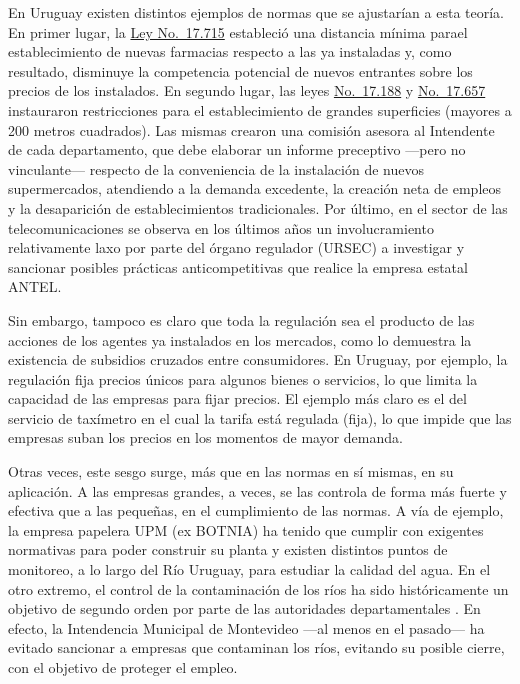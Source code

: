 \documentclass[
  12pt,
  spanish,
]{book}
\begin{document}
En Uruguay existen distintos ejemplos de normas que se ajustarían a esta
teoría. En primer lugar, la
\href{http://www.parlamento.gub.uy/leyes/AccesoTextoLey.asp?Ley=17715\&Anchor=}{Ley
No.~17.715} estableció una distancia mínima parael establecimiento de
nuevas farmacias respecto a las ya instaladas y, como resultado,
disminuye la competencia potencial de nuevos entrantes sobre los precios
de los instalados. En segundo lugar, las leyes
\href{http://www.parlamento.gub.uy/leyes/AccesoTextoLey.asp?Ley=17188\&Anchor=}{No.~17.188}
y
\href{http://www.parlamento.gub.uy/leyes/AccesoTextoLey.asp?Ley=17657\&Anchor=}{No.~17.657}
instauraron restricciones para el establecimiento de grandes superficies
(mayores a 200 metros cuadrados). Las mismas crearon una comisión
asesora al Intendente de cada departamento, que debe elaborar un informe
preceptivo ---pero no vinculante--- respecto de la conveniencia de la
instalación de nuevos supermercados, atendiendo a la demanda excedente,
la creación neta de empleos y la desaparición de establecimientos
tradicionales. Por último, en el sector de las telecomunicaciones se
observa en los últimos años un involucramiento relativamente laxo por
parte del órgano regulador (URSEC) a investigar y sancionar posibles
prácticas anticompetitivas que realice la empresa estatal ANTEL.

Sin embargo, tampoco es claro que toda la regulación sea el producto de
las acciones de los agentes ya instalados en los mercados, como lo
demuestra la existencia de subsidios cruzados entre consumidores. En
Uruguay, por ejemplo, la regulación fija precios únicos para algunos
bienes o servicios, lo que limita la capacidad de las empresas para
fijar precios. El ejemplo más claro es el del servicio de taxímetro en
el cual la tarifa está regulada (fija), lo que impide que las empresas
suban los precios en los momentos de mayor demanda.

Otras veces, este sesgo surge, más que en las normas en sí mismas, en su
aplicación. A las empresas grandes, a veces, se las controla de forma
más fuerte y efectiva que a las pequeñas, en el cumplimiento de las
normas. A vía de ejemplo, la empresa papelera UPM (ex BOTNIA) ha tenido
que cumplir con exigentes normativas para poder construir su planta y
existen distintos puntos de monitoreo, a lo largo del Río Uruguay, para
estudiar la calidad del agua. En el otro extremo, el control de la
contaminación de los ríos ha sido históricamente un objetivo de segundo
orden por parte de las autoridades departamentales \citep{Caffera2004}.
En efecto, la Intendencia Municipal de Montevideo ---al menos en el
pasado--- ha evitado sancionar a empresas que contaminan los ríos,
evitando su posible cierre, con el objetivo de proteger el empleo.
\end{document}
